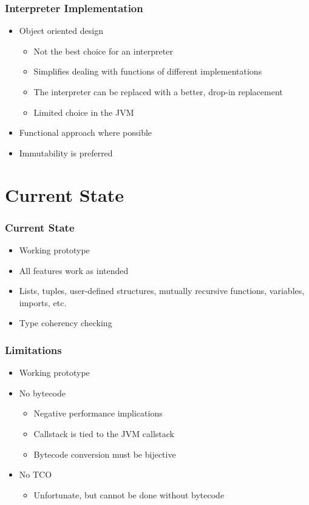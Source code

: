 \documentclass{beamer}
\begin{document}
\begin{frame}
    \frametitle{Interpreter Implementation}
    \begin{itemize}
        \item Object oriented design
            \begin{itemize}
                \item Not the best choice for an interpreter
                \item Simplifies dealing with functions of different implementations
                \item The interpreter can be replaced with a better, drop-in replacement
                \item Limited choice in the JVM
            \end{itemize}
        \item Functional approach where possible
        \item Immutability is preferred
    \end{itemize}
\end{frame}

\section{Current State}

\begin{frame}
    \frametitle{Current State}
    \begin{itemize}
        \item Working prototype
        \item All features work as intended
        \item Lists, tuples, user-defined structures, mutually recursive functions, variables,
            imports, etc.
        \item Type coherency checking
    \end{itemize}
\end{frame}

\begin{frame}
    \frametitle{Limitations}
    \begin{itemize}
        \item Working prototype
        \item No bytecode
            \begin{itemize}
                \item Negative performance implications
                \item Callstack is tied to the JVM callstack
                \item Bytecode conversion must be bijective
            \end{itemize}
        \item No TCO
            \begin{itemize}
                \item Unfortunate, but cannot be done without bytecode
            \end{itemize}
    \end{itemize}
\end{frame}
\end{document}
